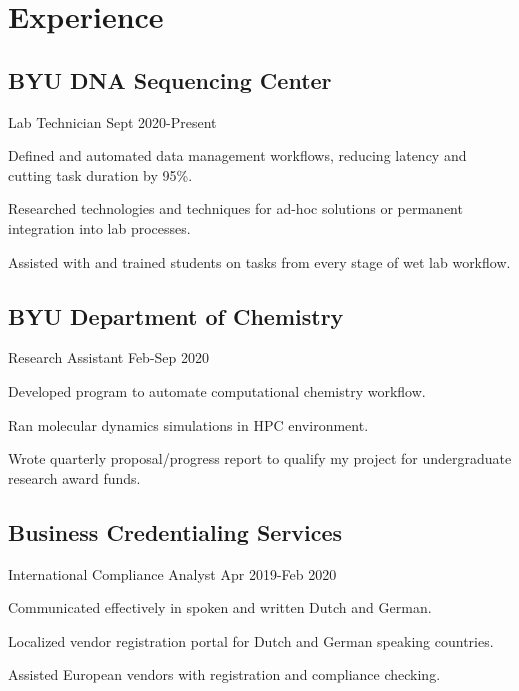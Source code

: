 \documentclass{article}
\newcommand{\role}[1]{
    \vspace{-\baselineskip}
    \vspace{8pt}
    #1
}
\begin{document}
\section{Experience}

\subsection{BYU DNA Sequencing Center}
\role{Lab Technician \hfill Sept 2020-Present}
\begin{blacksquareitemize}\itemsep1pt
    \item Defined and automated data management workflows, reducing latency and cutting task duration by 95\%.
    \item Researched technologies and techniques for ad-hoc solutions or permanent integration into lab processes.
    \item Assisted with and trained students on tasks from every stage of wet lab workflow.
\end{blacksquareitemize}

\subsection{BYU Department of Chemistry}
\role{Research Assistant \hfill Feb-Sep 2020}
\begin{blacksquareitemize}\itemsep1pt
    \item Developed program to automate computational chemistry workflow.
    \item Ran molecular dynamics simulations in HPC environment.
    \item Wrote quarterly proposal/progress report to qualify my project for undergraduate research award funds.
\end{blacksquareitemize}

\subsection{Business Credentialing Services}
\role{International Compliance Analyst \hfill Apr 2019-Feb 2020}
\begin{blacksquareitemize}\itemsep1pt
    \item Communicated effectively in spoken and written Dutch and German.
    \item Localized vendor registration portal for Dutch and German speaking countries.
    \item Assisted European vendors with registration and compliance checking.
\end{blacksquareitemize}
\end{document}
